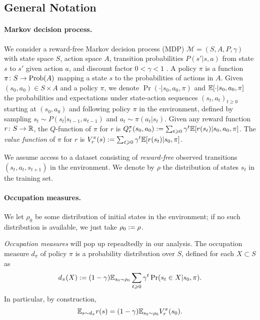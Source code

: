 \documentclass[11pt,a4paper]{article}
\begin{document}
\subsection{General Notation}
\label{sec:notation}

\paragraph{Markov decision process.}
We consider a reward-free Markov decision process (MDP) $\mathcal{M}=(S,A,P,\gamma)$
with state space $S$, action space $A$, transition probabilities
$P(s'|s,a)$ from state $s$ to $s'$ given action $a$,
and discount factor $0 < \gamma < 1$ \cite{sutton2018reinforcement}.
A policy $\pi$ is a function $\pi\colon S\to \mathrm{Prob}(A)$ mapping a
state $s$ to the probabilities of actions in $A$.
Given
$(s_0,a_0)\in S\times A$ and a policy $\pi$,
we denote $\Pr(\cdot|s_0,a_0,\pi)$ and $\mathbb{E}[\cdot|s_0,a_0,\pi]$ the
probabilities and expectations under state-action sequences $(s_t,a_t)_{t
\geq 0}$ starting at $(s_0,a_0)$ and following policy $\pi$ in the
environment, defined by sampling $s_t\sim P( s_t|s_{t-1},a_{t-1})$ and
$a_t\sim \pi( a_t | s_t)$.
Given any reward
function $r\colon S \to {\mathbb{R}}$, the $Q$-function of $\pi$ for $r$ is
$Q_r^\pi(s_0,a_0)\mathrel{\mathop{:}}= \sum_{t\geqslant 0} \gamma^t \mathbb{E}
[r(s_t)|s_0,a_0,\pi]$. The \emph{value function} of $\pi$ for $r$ is
$V_r^\pi(s)\mathrel{\mathop{:}}= \sum_{t\geqslant 0} \gamma^t \mathbb{E}
[r(s_t)|s_0,\pi]$.

We assume access to a dataset consisting of \emph{reward-free} observed
transitions $(s_t,a_t,s_{t+1})$ in the environment. We denote by $\rho$
the distribution of states $s_t$ in the training set.

\paragraph{Occupation measures.} We let $\rho_0$ be some distribution of initial states in the environment; if no such
distribution is available, we just take $\rho_0\mathrel{\mathop{:}}= \rho$.

\emph{Occupation measures} will pop up repeadtedly in our analysis. The
occupation measure $d_\pi$ of policy $\pi$ is a probability distribution over $S$, defined
for each $X\subset S$ as
\begin{equation}
\label{eq:dpi}
d_\pi(X)\deq (1-\gamma) \E_{s_0\sim \rho_0} \sum_{t\geq 0} \gamma^t \Pr(s_t\in
X|s_0,\pi).
\end{equation}
In particular, by construction,
\begin{equation}
\label{eq:Vsucc}
\mathbb{E}_{s\sim d_\pi} r(s)=(1-\gamma)
\mathbb{E}_{s_0\sim \rho_0} V^\pi_r(s_0).
\end{equation}
\end{document}
